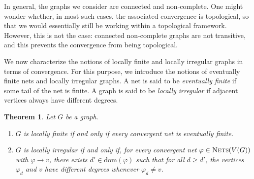 \documentclass{amsart}
\newtheorem{theorem}{Theorem}[section]
\theoremstyle{definition}
\theoremstyle{remark}
\numberwithin{equation}{section}
\begin{document}
In general, the graphs we consider are connected and non-complete. One might wonder whether, in most such cases, the associated convergence is topological, so that we would essentially still be working within a topological framework. 
However, this is not the case: connected non-complete graphs are not transitive, and this prevents the convergence from being topological.

We now characterize the notions of locally finite and locally irregular graphs in terms of convergence. For this purpose, we introduce the notions of eventually finite nets and locally irregular graphs.
A net is said to be \emph{eventually finite} if some tail of the net is finite. A graph is said to be \emph{locally irregular} if adjacent vertices always have different degrees.


\begin{theorem}
	\label{localfinite}
Let $G$ be a graph.
\begin{enumerate}
	\item $G$ is locally finite if and only if every convergent net is eventually finite.
	
	\item $G$ is locally irregular if and only if, for every convergent net 
	$\varphi\in\textsc{Nets}(V(G))$ with $\varphi\to v$, there exists 
	$d'\in\mathrm{dom}(\varphi)$ such that for all $d\ge d'$, the vertices 
	$\varphi_d$ and $v$ have different degrees whenever $\varphi_d\neq v$.
\end{enumerate}
\end{theorem}
\end{document}
